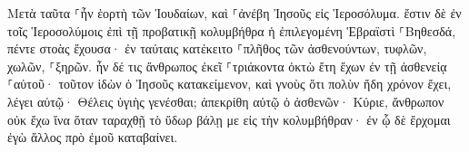 \documentclass{openreader}
\begin{document}
Μετὰ ταῦτα ⸀ἦν ἑορτὴ τῶν Ἰουδαίων, καὶ ⸀ἀνέβη Ἰησοῦς εἰς Ἱεροσόλυμα. 
ἔστιν δὲ ἐν τοῖς Ἱεροσολύμοις ἐπὶ τῇ προβατικῇ κολυμβήθρα ἡ ἐπιλεγομένη Ἑβραϊστὶ ⸀Βηθεσδά, πέντε στοὰς ἔχουσα· 
ἐν ταύταις κατέκειτο ⸀πλῆθος τῶν ἀσθενούντων, τυφλῶν, χωλῶν, ⸀ξηρῶν. 
ἦν δέ τις ἄνθρωπος ἐκεῖ ⸀τριάκοντα ὀκτὼ ἔτη ἔχων ἐν τῇ ἀσθενείᾳ ⸀αὐτοῦ· 
τοῦτον ἰδὼν ὁ Ἰησοῦς κατακείμενον, καὶ γνοὺς ὅτι πολὺν ἤδη χρόνον ἔχει, λέγει αὐτῷ· Θέλεις ὑγιὴς γενέσθαι; 
ἀπεκρίθη αὐτῷ ὁ ἀσθενῶν· Κύριε, ἄνθρωπον οὐκ ἔχω ἵνα ὅταν ταραχθῇ τὸ ὕδωρ βάλῃ με εἰς τὴν κολυμβήθραν· ἐν ᾧ δὲ ἔρχομαι ἐγὼ ἄλλος πρὸ ἐμοῦ καταβαίνει. 
\end{document}
